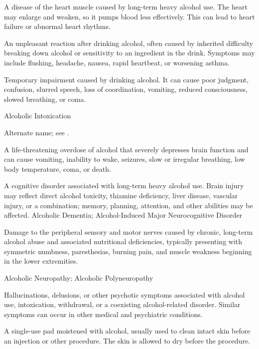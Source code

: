  A disease of the heart muscle caused
by long-term heavy alcohol use. The heart may enlarge and weaken, so it pumps
blood less effectively. This can lead to heart failure or abnormal heart
rhythms.

 An unpleasant reaction after drinking alcohol, often caused by inherited difficulty breaking down alcohol or sensitivity to an ingredient in the drink. Symptoms may include flushing, headache, nausea, rapid heartbeat, or worsening asthma.

 Temporary impairment caused by drinking alcohol. It can cause poor judgment, confusion, slurred speech, loss of coordination, vomiting, reduced consciousness, slowed breathing, or coma.

\synonyms
Alcoholic Intoxication

 Alternate name; see .

 A life-threatening overdose of alcohol that severely depresses brain function and can cause vomiting, inability to wake, seizures, slow or irregular breathing, low body temperature, coma, or death.

 A cognitive disorder associated with long-term heavy alcohol use. Brain injury may reflect direct alcohol toxicity, thiamine deficiency, liver disease, vascular injury, or a combination; memory, planning, attention, and other abilities may be affected.
\synonyms
Alcoholic Dementia; Alcohol-Induced Major Neurocognitive Disorder

 Damage to the peripheral sensory and motor nerves caused by chronic, long-term alcohol abuse and associated nutritional deficiencies, typically presenting with symmetric numbness, paresthesias, burning pain, and muscle weakness beginning in the lower extremities.

\synonyms
Alcoholic Neuropathy; Alcoholic Polyneuropathy

 Hallucinations, delusions, or other psychotic symptoms associated with alcohol use, intoxication, withdrawal, or a coexisting alcohol-related disorder. Similar symptoms can occur in other medical and psychiatric conditions.

 A single-use pad moistened with alcohol, usually used to clean intact skin before an injection or other procedure. The skin is allowed to dry before the procedure.

